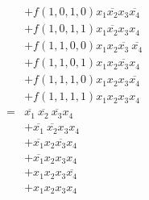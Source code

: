 \documentclass[DIN, pagenumber=false, fontsize=11pt, parskip=half]{scrartcl}
\begin{document}
\begin{enumerate}[label=(\alph*)]
\begin{eqnarray*}
                &&+ f(1, 0, 1, 0) x_1 \overline{x_2} x_3 \overline{x_4}\\
                &&+ f(1, 0, 1, 1) x_1 \overline{x_2} x_3 x_4\\
                &&+ f(1, 1, 0, 0) x_1 x_2 \overline{x_3} \ \overline{x_4}\\
                &&+ f(1, 1, 0, 1) x_1 x_2 \overline{x_3} x_4\\
                &&+ f(1, 1, 1, 0) x_1 x_2 x_3 \overline{x_4}\\
                &&+ f(1, 1, 1, 1) x_1 x_2 x_3 x_4\\
                &=&  \overline{x_1} \ \overline{x_2} \ \overline{x_3} x_4\\
                &&+ \overline{x_1} \ \overline{x_2} x_3 x_4\\
                &&+ \overline{x_1} x_2 \overline{x_3} x_4\\
                &&+ \overline{x_1} x_2 x_3 x_4\\
                &&+ x_1 x_2 x_3 \overline{x_4}\\
                &&+ x_1 x_2 x_3 x_4\\
            \end{eqnarray*}
    \end{enumerate}
\end{document}
